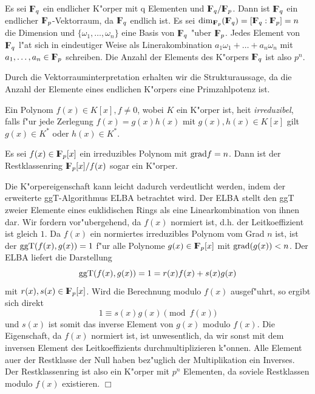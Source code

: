   Es sei $\koerper{q}$ ein endlicher K"orper mit q Elementen und 
  $\koerper{q}/\koerper{p}$. Dann ist $\koerper{q}$ ein endlicher 
  $\koerper{p}$-Vektorraum, da $\koerper{q}$ endlich ist. Es sei
  $ \mbox{dim}_{\koerper{p}}(\koerper{q}) = [\koerper{q} : \koerper{p}] = n$
  die Dimension und $\{\omega_1, \ldots, \omega_n\}$ eine Basis von
  $\koerper{q}$ "uber $\koerper{p}$. Jedes Element von $\koerper{q}$ l"a\3t
  sich in eindeutiger Weise als Linerakombination
  $ a_1 \omega_1 + \ldots + a_n \omega_n $
  mit $a_1, \ldots, a_n\in\koerper{p}$ schreiben. Die Anzahl der Elements
  des K"orpers $\koerper{q}$ ist also $p^n$.

  Durch die Vektorrauminterpretation erhalten wir die Strukturaussage, da\3
  die Anzahl der Elemente eines endlichen K"orpers eine Primzahlpotenz
  ist.
  \begin{definition}[Irreduzibel]
    Ein Polynom $f(x)\in K[x], f\neq 0$, wobei $K$ ein K"orper ist, hei\3t 
    {\em irreduzibel}, falls f"ur jede Zerlegung $f(x)=g(x) h(x)$ mit 
    $g(x),h(x)\in K[x]$ 
    gilt $g(x)\in K^*$ oder $h(x)\in K^*$. 
  \end{definition} 

  \begin{satz}
    Es sei $f(x)\in\koerper{p}[x]$ ein irreduzibles Polynom mit $\mbox{grad} f=n$.
    Dann ist der Restklassenring $\koerper{p}[x]/f(x)$ sogar ein K"orper.
  \end{satz}
  \beweis Die K"orpereigenschaft kann leicht dadurch verdeutlicht werden, 
  indem der erweiterte ggT-Algorithmus ELBA betrachtet wird. Der ELBA
  stellt den ggT zweier Elemente eines euklidischen Rings als eine
  Linearkombination von ihnen dar. 
  Wir fordern vor"ubergehend, da\3 $f(x)$ normiert ist, d.h. der 
  Leitkoeffizient ist gleich $1$. Da $f(x)$ ein normiertes irreduzibles 
  Polynom vom Grad $n$ ist, ist der $\mbox{ggT} (f(x),g(x))=1$ f"ur alle 
  Polynome $g(x)\in\koerper{p}[x]$ mit $\mbox{grad}(g(x)) < n$. 
  Der ELBA liefert die Darstellung 
  $$ \mbox{ggT} (f(x),g(x)) = 1 = r(x)f(x)+s(x)g(x) $$
  mit $r(x), s(x)\in\koerper{p}[x]$. Wird die Berechnung modulo $f(x)$
  ausgef"uhrt, so ergibt sich direkt
  $$ 1\equiv s(x)g(x) \pmod{f(x)} $$
  und $s(x)$ ist somit das inverse Element von $g(x)$ modulo $f(x)$.
  Die Eigenschaft, da\3 $f(x)$ normiert ist, ist unwesentlich, da wir sonst
  mit dem inversen Element des Leitkoeffizients durchmultiplizieren k"onnen.
  Alle Element au\3er der Restklasse der Null haben bez"uglich der 
  Multiplikation ein Inverses. Der Restklassenring ist also ein K"orper 
  mit $p^n$ Elementen, da soviele Restklassen modulo $f(x)$ existieren. 
  \hfill $\Box$

